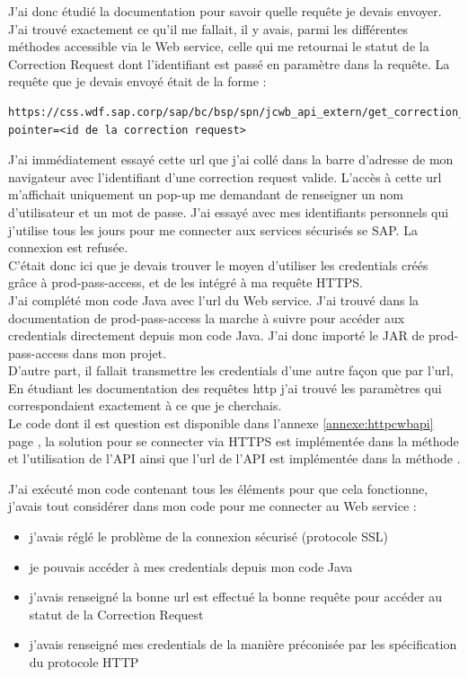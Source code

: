 J'ai donc étudié la documentation pour savoir quelle requête je devais envoyer.\\
J'ai trouvé exactement ce qu'il me fallait, il y avais, parmi les différentes méthodes accessible via le \gls{Web service}, celle qui me retournai le statut de la Correction Request dont l'identifiant est passé en paramètre dans la requête. La requête que je devais envoyé était de la forme :
\begin{lstlisting}
https://css.wdf.sap.corp/sap/bc/bsp/spn/jcwb_api_extern/get_correction_requests?pointer=<id de la correction request>
\end{lstlisting}

J'ai immédiatement essayé cette url que j'ai collé dans la barre d'adresse de mon navigateur avec l'identifiant d'une correction request valide. L'accès à cette url m'affichait uniquement un pop-up me demandant de renseigner un nom d'utilisateur et un mot de passe. J'ai essayé avec mes identifiants personnels qui j'utilise tous les jours pour me connecter aux services sécurisés se SAP. La connexion est refusée.\\
C'était donc ici que je devais trouver le moyen d'utiliser les credentials créés grâce à prod-pass-access, et de les intégré à ma requête HTTPS.\\
J'ai complété mon code \gls{Java} avec l'url du \gls{Web service}. J'ai trouvé dans la documentation de prod-pass-access la marche à suivre pour accéder aux credentials directement depuis mon code \gls{Java}. J'ai donc importé le \gls{JAR} de prod-pass-access dans mon projet.\\
D'autre part, il fallait transmettre les credentials d'une autre façon que par l'url, En étudiant les documentation des requêtes http j'ai trouvé les paramètres qui correspondaient exactement à ce que je cherchais.\\
Le code dont il est question est disponible dans l'annexe \ref{annexe:httpcwbapi} page \pageref{annexe:httpcwbapi}, la solution pour se connecter via HTTPS est implémentée dans la méthode  et l'utilisation de l'API ainsi que l'url de l'\gls{API}  est implémentée dans la méthode .

J'ai exécuté mon code contenant tous les éléments pour que cela fonctionne, j'avais tout considérer dans mon code pour me connecter au \gls{Web service} :
\begin{itemize}
	\item j'avais réglé le problème de la connexion sécurisé (protocole SSL)
	\item je pouvais accéder à mes credentials depuis mon code \gls{Java}
	\item j'avais renseigné la bonne url est effectué la bonne requête pour accéder au statut de la Correction Request
	\item j'avais renseigné mes credentials de la manière préconisée par les spécification du protocole HTTP
\end{itemize}


